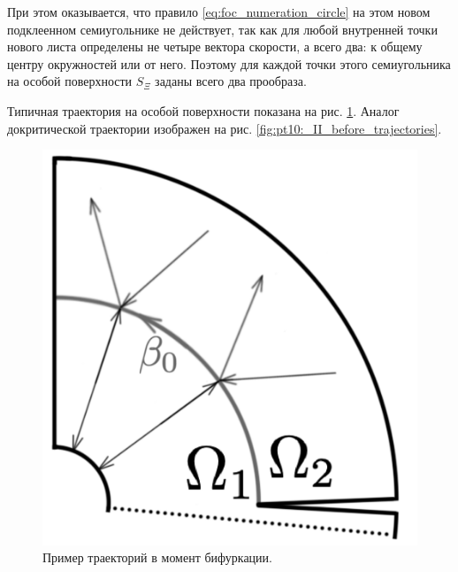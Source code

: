При этом оказывается, что правило \eqref{eq:foc_numeration_circle} на этом новом подклеенном семиугольнике не действует, так как для любой внутренней точки нового листа определены не четыре вектора скорости, а всего два: к общему центру окружностей или от него. Поэтому для каждой точки этого семиугольника на особой поверхности $S_\Xi$ заданы всего два прообраза. 

Типичная траектория на особой поверхности показана на рис.     \ref{fig:pt10:_II_trajectories_1}. Аналог докритической траектории изображен на рис.     \ref{fig:pt10:_II_before_trajectories}.
\begin{figure}[!htb]
\centering
\includegraphics[scale=0.1]{images/ch4/section3_circular/atoms/II/bifurcation/trajectories_1.pdf}
    \caption{Пример траекторий в момент бифуркации.}
    \label{fig:pt10:_II_trajectories_1}
\endminipage\hfill
{}
\centering

\end{figure}
